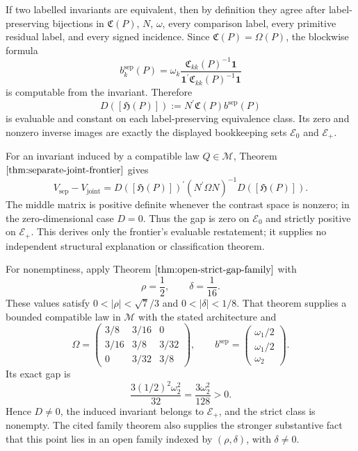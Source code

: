If two labelled invariants are equivalent, then by definition they agree after label-preserving bijections in \(\mathfrak C(P)\), \(N\), \(\omega\), every comparison label, every primitive residual label, and every signed incidence. Since \(\mathfrak C(P)=\Omega(P)\), the blockwise formula
\[
 b_k^{\mathrm{sep}}(P)
 =\omega_k\frac{\mathfrak C_{kk}(P)^{-1}\mathbf 1}
 {\mathbf 1^{\prime}\mathfrak C_{kk}(P)^{-1}\mathbf 1}
\]
is computable from the invariant. Therefore
\[
 D([\mathfrak H(P)])
 :=N^{\prime}\mathfrak C(P)b^{\mathrm{sep}}(P)
\]
is evaluable and constant on each label-preserving equivalence class. Its zero and nonzero inverse images are exactly the displayed bookkeeping sets \(\mathscr E_0\) and \(\mathscr E_+\).

For an invariant induced by a compatible law \(Q\in\mathcal M\), Theorem \(\ref{thm:separate-joint-frontier}\) gives
\[
 V_{\mathrm{sep}}-V_{\mathrm{joint}}
 =D([\mathfrak H(P)])^{\prime}
  (N^{\prime}\Omega N)^{-1}
  D([\mathfrak H(P)]).
\]
The middle matrix is positive definite whenever the contrast space is nonzero; in the zero-dimensional case \(D=0\). Thus the gap is zero on \(\mathscr E_0\) and strictly positive on \(\mathscr E_+\). This derives only the frontier's evaluable restatement; it supplies no independent structural explanation or classification theorem.

For nonemptiness, apply Theorem \(\ref{thm:open-strict-gap-family}\) with
\[
 \rho=\frac12,
 \qquad
 \delta=\frac1{16}.
\]
These values satisfy \(0<|\rho|<\sqrt7/3\) and \(0<|\delta|<1/8\). That theorem supplies a bounded compatible law in \(\mathcal M\) with the stated architecture and
\[
 \Omega=
 \begin{pmatrix}
 3/8&3/16&0\\
 3/16&3/8&3/32\\
 0&3/32&3/8
 \end{pmatrix},
 \qquad
 b^{\mathrm{sep}}
 =\begin{pmatrix}\omega_1/2\\\omega_1/2\\\omega_2\end{pmatrix}.
\]
Its exact gap is
\[
 \frac{3(1/2)^2\omega_2^2}{32}
 =\frac{3\omega_2^2}{128}>0.
\]
Hence \(D\ne0\), the induced invariant belongs to \(\mathscr E_+\), and the strict class is nonempty. The cited family theorem also supplies the stronger substantive fact that this point lies in an open family indexed by \((\rho,\delta)\), with \(\delta\ne0\).